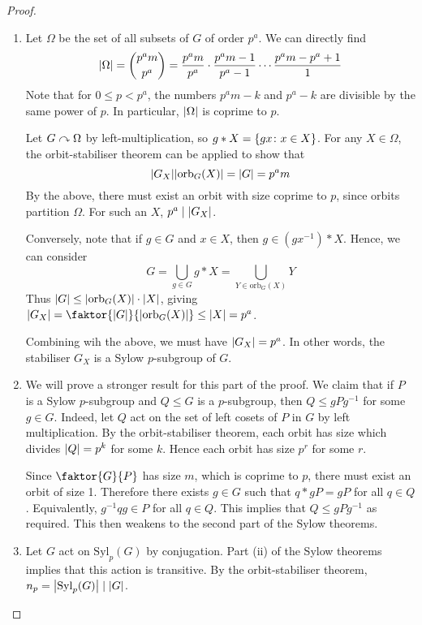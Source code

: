 \begin{proof}
	\begin{enumerate}
		\item Let \( \Omega \) be the set of all subsets of \( G \) of order \( p^a \).
		      We can directly find
		      \[
			      \abs{\Omega} = \binom{p^a m}{p^a} = \frac{p^a m}{p^a} \cdot \frac{p^a m - 1}{p^a - 1} \cdots \frac{p^a m - p^a + 1}{1}
		      \]
		      Note that for \( 0 \leq p < p^a \), the numbers \( p^a m - k \) and \( p^a - k \) are divisible by the same power of \( p \).
		      In particular, \( \abs{\Omega} \) is coprime to \( p \).

		      Let \( G \curvearrowright \Omega \) by left-multiplication, so \( g \ast X = \qty{gx \colon x \in X} \).
		      For any \( X \in \Omega \), the orbit-stabiliser theorem can be applied to show that
		      \[
			      \abs{G_X} \abs{\mathrm{orb}_G(X)} = \abs{G} = p^a m
		      \]
		      By the above, there must exist an orbit with size coprime to \( p \), since orbits partition \( \Omega \).
		      For such an \( X \), \( p^a \mid \abs{G_X} \).

		      Conversely, note that if \( g \in G \) and \( x \in X \), then \( g \in (gx^{-1}) \ast X \).
		      Hence, we can consider
		      \[
			      G = \bigcup_{g \in G} g \ast X = \bigcup_{Y \in \mathrm{orb}_G(X)} Y
		      \]
		      Thus \( \abs{G} \leq \abs{\mathrm{orb}_G(X)} \cdot \abs{X} \), giving \( \abs{G_X} = \faktor{\abs{G}}{\abs{\mathrm{orb}_G(X)}} \leq \abs{X} = p^a \).

		      Combining wih the above, we must have \( \abs{G_X} = p^a \).
		      In other words, the stabiliser \( G_X \) is a Sylow \( p \)-subgroup of \( G \).
		\item We will prove a stronger result for this part of the proof.
		      We claim that if \( P \) is a Sylow \( p \)-subgroup and \( Q \leq G \) is a \( p \)-subgroup, then \( Q \leq g P g^{-1} \) for some \( g \in G \).
		      Indeed, let \( Q \) act on the set of left cosets of \( P \) in \( G \) by left multiplication.
		      By the orbit-stabiliser theorem, each orbit has size which divides \( \abs{Q} = p^k \) for some \( k \).
		      Hence each orbit has size \( p^r \) for some \( r \).

		      Since \( \faktor{G}{P} \) has size \( m \), which is coprime to \( p \), there must exist an orbit of size 1.
		      Therefore there exists \( g \in G \) such that \( q \ast gP = gP \) for all \( q \in Q \).
		      Equivalently, \( g^{-1} q g \in P \) for all \( q \in Q \).
		      This implies that \( Q \leq gPg^{-1} \) as required.
		      This then weakens to the second part of the Sylow theorems.
		\item Let \( G \) act on \( \mathrm{Syl}_p(G) \) by conjugation.
		      Part (ii) of the Sylow theorems implies that this action is transitive.
		      By the orbit-stabiliser theorem, \( n_p = \abs{\mathrm{Syl}_p(G)} \mid \abs{G} \).


\end{enumerate}
\end{proof}

